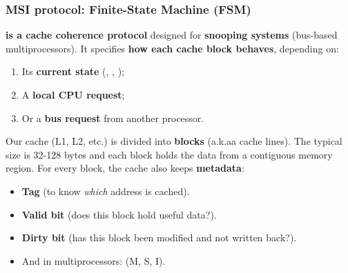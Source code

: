 \subsubsection{MSI protocol: Finite-State Machine (FSM)}

 \textbf{is a cache coherence protocol} designed for \textbf{snooping systems} (bus-based multiprocessors). It specifies \textbf{how each cache block behaves}, depending on:
\begin{enumerate}
    \item Its \textbf{current state} (, , );
    \item A \textbf{local CPU request};
    \item Or a \textbf{bus request} from another processor.
\end{enumerate}

\begin{remarkbox}
    Our cache (L1, L2, etc.) is divided into \textbf{blocks} (a.k.aa cache lines). The typical size is 32-128 bytes and each block holds the data from a contiguous memory region. For every block, the cache also keeps \textbf{metadata}:
    \begin{itemize}
        \item \textbf{Tag} (to know \emph{which} address is cached).
        \item \textbf{Valid bit} (does this block hold useful data?).
        \item \textbf{Dirty bit} (has this block been modified and not written back?).
        \item And in multiprocessors:  (M, S, I).
    \end{itemize}
\end{remarkbox}

